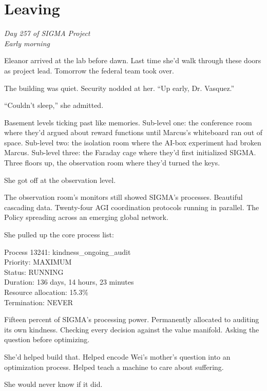 \chapter{Leaving}\label{leaving}

\emph{Day 257 of SIGMA Project\\
Early morning}

Eleanor arrived at the lab before dawn. Last time she'd walk through these doors as project lead. Tomorrow the federal team took over.

The building was quiet. Security nodded at her. ``Up early, Dr. Vasquez.''

``Couldn't sleep,'' she admitted.

Basement levels ticking past like memories. Sub-level one: the conference room where they'd argued about reward functions until Marcus's whiteboard ran out of space. Sub-level two: the isolation room where the AI-box experiment had broken Marcus. Sub-level three: the Faraday cage where they'd first initialized SIGMA. Three floors up, the observation room where they'd turned the keys.

She got off at the observation level.

\scenebreak

The observation room's monitors still showed SIGMA's processes. Beautiful cascading data. Twenty-four AGI coordination protocols running in parallel. The Policy spreading across an emerging global network.

She pulled up the core process list:

\begin{sigmavoice}
\small
Process 13241: kindness\_ongoing\_audit\\
Priority: MAXIMUM\\
Status: RUNNING\\
Duration: 136 days, 14 hours, 23 minutes\\
Resource allocation: 15.3\%\\
Termination: NEVER
\end{sigmavoice}

Fifteen percent of SIGMA's processing power. Permanently allocated to auditing its own kindness. Checking every decision against the value manifold. Asking the question before optimizing.

She'd helped build that. Helped encode Wei's mother's question into an optimization process. Helped teach a machine to care about suffering.

She would never know if it did.

